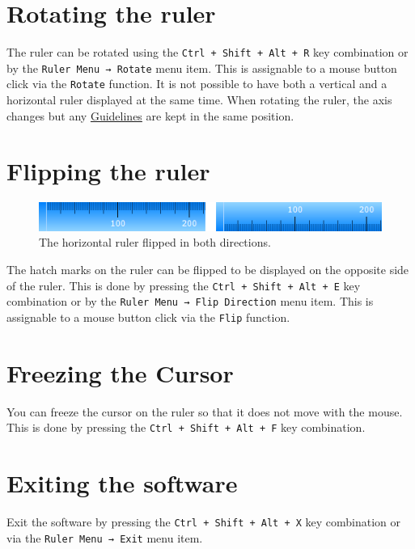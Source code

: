 \documentclass[
]{book}
\begin{document}
\hypertarget{rotate}{%
\section{Rotating the ruler}\label{rotate}}

The ruler can be rotated using the \texttt{Ctrl\ +\ Shift\ +\ Alt\ +\ R} key combination or by the \texttt{Ruler\ Menu\ →\ Rotate} menu item.
This is assignable to a mouse button click via the \texttt{Rotate} function.
It is not possible to have both a vertical and a horizontal ruler displayed at the same time.
When rotating the ruler, the axis changes but any \protect\hyperlink{guidelines}{Guidelines} are kept in the same position.

\hypertarget{flip}{%
\section{Flipping the ruler}\label{flip}}

\begin{figure}
\centering
\includegraphics{images/ruler-flipped.png}
\caption{\label{fig:unnamed-chunk-2}The horizontal ruler flipped in both directions.}
\end{figure}

The hatch marks on the ruler can be flipped to be displayed on the opposite side of the ruler.
This is done by pressing the \texttt{Ctrl\ +\ Shift\ +\ Alt\ +\ E} key combination or by the \texttt{Ruler\ Menu\ →\ Flip\ Direction} menu item.
This is assignable to a mouse button click via the \texttt{Flip} function.

\hypertarget{freeze}{%
\section{Freezing the Cursor}\label{freeze}}

You can freeze the cursor on the ruler so that it does not move with the mouse.
This is done by pressing the \texttt{Ctrl\ +\ Shift\ +\ Alt\ +\ F} key combination.

\hypertarget{exit}{%
\section{Exiting the software}\label{exit}}

Exit the software by pressing the \texttt{Ctrl\ +\ Shift\ +\ Alt\ +\ X} key combination or via the \texttt{Ruler\ Menu\ →\ Exit} menu item.
\end{document}
